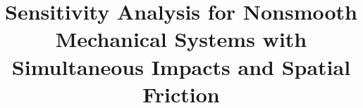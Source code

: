 \newcommand{\mytitle}{Sensitivity Analysis for Nonsmooth Mechanical Systems with Simultaneous Impacts and Spatial Friction}
\title{\mytitle}






\pagestyle{plain} %




\pagestyle{plain}
\tableofcontents








\cleartooddpage
\pagestyle{plain}







